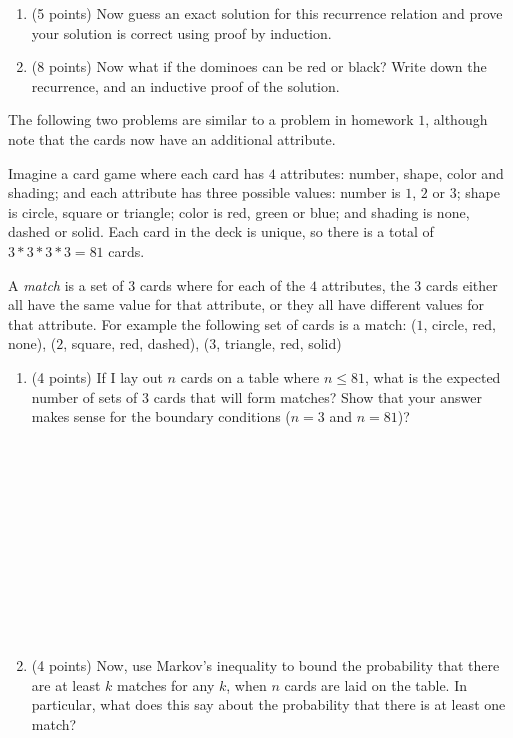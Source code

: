 \documentclass[11pt]{article}
\begin{document}
\begin{enumerate}
\begin{enumerate}
 \item (5 points) Now guess an exact solution for this recurrence relation and prove your solution is correct using proof by induction.

\pagebreak

\item (8 points) Now what if the dominoes can be red or black?  Write down the recurrence, and an inductive proof of the solution.

 \end{enumerate}

 
 
 The following two problems are similar to a problem in homework $1$, although note that the cards now have an additional attribute.
 
 Imagine a card game where each card has $4$ attributes: number, shape, color and shading; and each attribute has three possible values: number is $1$, $2$ or $3$; shape is circle, square or triangle; color is red, green or blue; and shading is none, dashed or solid.  Each card in the deck is unique, so there is a total of $3*3*3*3 = 81$ cards.
 
 A \emph{match} is a set of $3$ cards where for each of the $4$ attributes, the $3$ cards either all have the same value for that attribute, or they all have different values for that attribute.  For example the following set of cards is a match: ($1$, circle, red, none), ($2$, square, red, dashed), ($3$, triangle, red, solid)
 
 \begin{enumerate}
 \item (4 points) If I lay out $n$ cards on a table where $n \leq 81$, what is the expected number of sets of $3$ cards that will form matches?  Show that your answer makes sense for the boundary conditions ($n=3$ and $n=81$)?
  \ \\ \ \\  \ \\ \ \\ \ \\  \ \\ \ \\ \ \\  \ \\ \ \\ \ \\  \ \\

 
 \item (4 points) Now, use Markov's inequality to bound the probability that there are at least $k$ matches for any $k$, when $n$ cards are laid on the table.  In particular, what does this say about the probability that there is at least one match?
  

\end{enumerate}
\end{enumerate}
\end{document}

